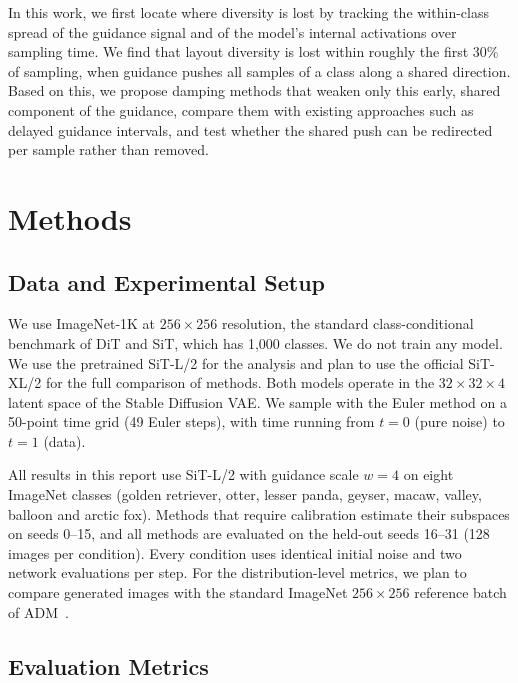 \documentclass[sigconf,nonacm]{acmart}
\begin{document}
In this work, we first locate where diversity is lost by tracking the within-class spread of the guidance signal and of the model's internal activations over sampling time. We find that layout diversity is lost within roughly the first 30\% of sampling, when guidance pushes all samples of a class along a shared direction. Based on this, we propose damping methods that weaken only this early, shared component of the guidance, compare them with existing approaches such as delayed guidance intervals, and test whether the shared push can be redirected per sample rather than removed.

\section{Methods}
\label{sec:methods}

\subsection{Data and Experimental Setup}
\label{sec:data}

We use ImageNet-1K at $256\times256$ resolution, the standard class-conditional benchmark of DiT and SiT, which has 1{,}000 classes. We do not train any model. We use the pretrained SiT-L/2 for the analysis and plan to use the official SiT-XL/2 for the full comparison of methods. Both models operate in the $32\times32\times4$ latent space of the Stable Diffusion VAE. We sample with the Euler method on a 50-point time grid (49 Euler steps), with time running from $t=0$ (pure noise) to $t=1$ (data).

All results in this report use SiT-L/2 with guidance scale $w=4$ on eight ImageNet classes (golden retriever, otter, lesser panda, geyser, macaw, valley, balloon and arctic fox). Methods that require calibration estimate their subspaces on seeds 0--15, and all methods are evaluated on the held-out seeds 16--31 (128 images per condition). Every condition uses identical initial noise and two network evaluations per step. For the distribution-level metrics, we plan to compare generated images with the standard ImageNet $256\times256$ reference batch of ADM~\cite{dhariwal2021beat}.

\subsection{Evaluation Metrics}
\label{sec:metrics}
\end{document}
